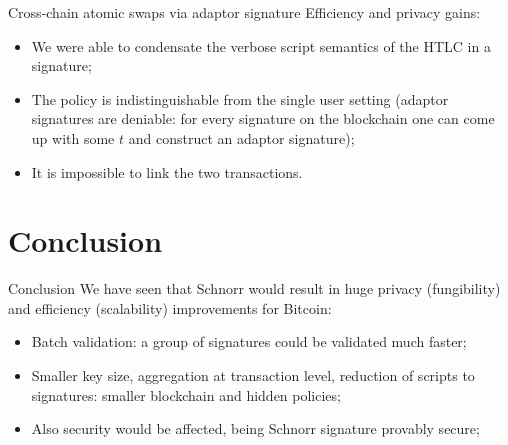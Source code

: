 \documentclass[slidescentered]{beamer}
\begin{document}
\begin{frame}[t]
	\end{frame}

	\begin{frame}{Cross-chain atomic swaps via adaptor signature}
		Efficiency and privacy gains:
		\begin{itemize}
			\item We were able to condensate the verbose script semantics of the HTLC in a signature;
			\item The policy is indistinguishable from the single user setting (adaptor signatures are deniable: for every signature on the blockchain one can come up with some $t$ and construct an adaptor signature);
			\item It is impossible to link the two transactions.
		\end{itemize}
	\end{frame}

	\section{Conclusion}
	\begin{frame}{Conclusion}
		We have seen that Schnorr would result in huge privacy (fungibility) and efficiency (scalability) improvements for Bitcoin:
		\begin{itemize}
			\item  Batch validation: a group of signatures could be validated much faster;
			\item Smaller key size, aggregation at transaction level, reduction of scripts to signatures: smaller blockchain and hidden policies;
			\item Also security would be affected, being Schnorr signature provably secure;
		\end{itemize}
	
	\end{frame}
\end{document}
